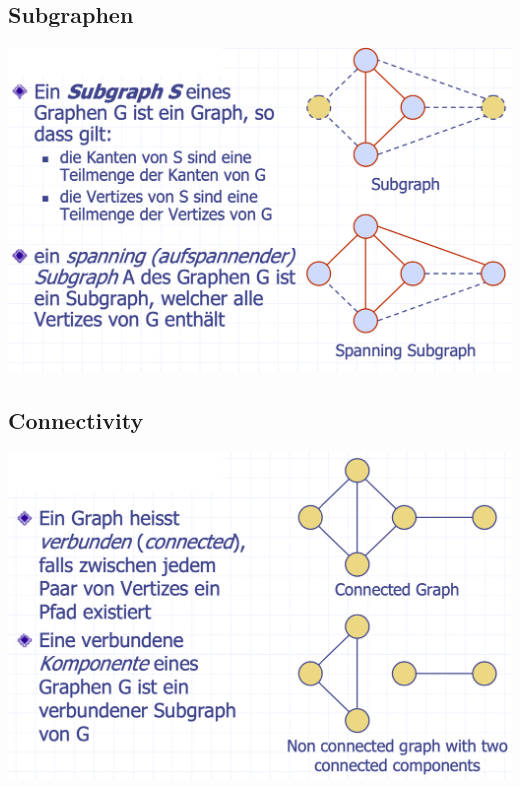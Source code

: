 \subsection{Subgraphen}
\begin{center}
    \includegraphics[scale=.23]{graphic/11 Graph/Subgraphen.png}
\end{center}
\vspace{-8pt}

\subsection{Connectivity}
\begin{center}
    \includegraphics[scale=.2]{graphic/11 Graph/Connectivity.png}
\end{center}
\vspace{-8pt}


